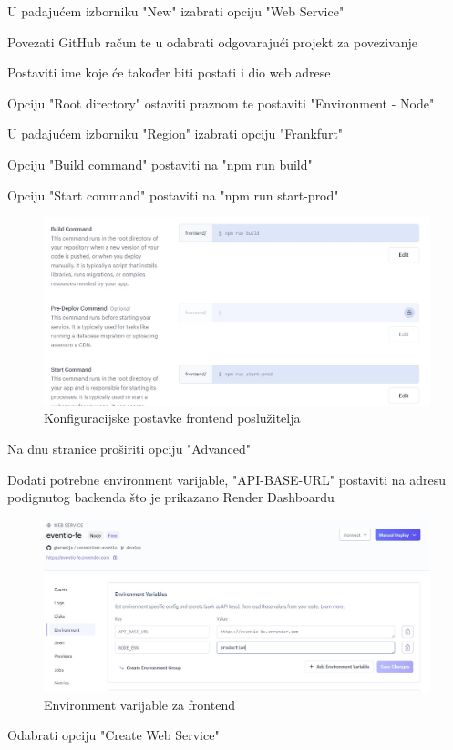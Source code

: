 			\begin{packed_enum}
				
				\item  U padajućem izborniku "New" izabrati opciju "Web Service"
				\item	Povezati GitHub račun te u odabrati odgovarajući projekt za povezivanje
				\item	Postaviti ime koje će također biti postati i dio web adrese
				\item	Opciju "Root directory" ostaviti praznom te postaviti "Environment - Node"
				\item 	U padajućem izborniku "Region" izabrati opciju "Frankfurt"
				\item 	Opciju "Build command" postaviti na "npm run build"
				\item 	Opciju "Start command" postaviti na "npm run start-prod"
				
				\begin{figure}[H]
					\includegraphics[scale=0.4]{deploy/frontendConf.jpeg}
					\centering
					\caption{Konfiguracijske postavke frontend poslužitelja}
					\label{fig:promjene}
				\end{figure}
				
				\item 	Na dnu stranice proširiti opciju "Advanced"
				\item 	Dodati potrebne environment varijable, "API-BASE-URL" postaviti na adresu podignutog backenda što je prikazano Render Dashboardu
				
				\begin{figure}[H]
					\includegraphics[scale=0.25]{deploy/frontendEnv.jpeg}
					\centering
					\caption{Environment varijable za frontend}
					\label{fig:promjene}
				\end{figure}
				
				\item 	Odabrati opciju "Create Web Service"
				
				
			\end{packed_enum}
			
			
			\eject 